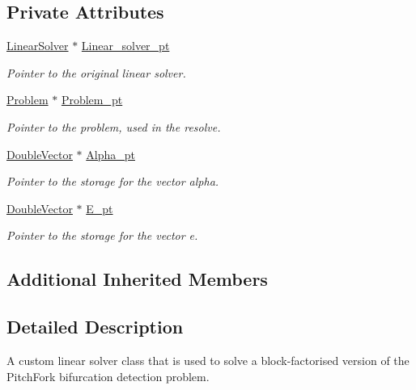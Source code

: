 \subsection*{Private Attributes}
\begin{DoxyCompactItemize}
\item 
\hyperlink{classoomph_1_1LinearSolver}{Linear\+Solver} $\ast$ \hyperlink{classoomph_1_1AugmentedBlockPitchForkLinearSolver_a1a3e1949c94c04c3b4ec19f0b895f97c}{Linear\+\_\+solver\+\_\+pt}
\begin{DoxyCompactList}\small\item\em Pointer to the original linear solver. \end{DoxyCompactList}\item 
\hyperlink{classoomph_1_1Problem}{Problem} $\ast$ \hyperlink{classoomph_1_1AugmentedBlockPitchForkLinearSolver_ad9e72a0a848aebe2b107a56b45aa4552}{Problem\+\_\+pt}
\begin{DoxyCompactList}\small\item\em Pointer to the problem, used in the resolve. \end{DoxyCompactList}\item 
\hyperlink{classoomph_1_1DoubleVector}{Double\+Vector} $\ast$ \hyperlink{classoomph_1_1AugmentedBlockPitchForkLinearSolver_a37d6d7eb053d062cabc6688f7c8fe240}{Alpha\+\_\+pt}
\begin{DoxyCompactList}\small\item\em Pointer to the storage for the vector alpha. \end{DoxyCompactList}\item 
\hyperlink{classoomph_1_1DoubleVector}{Double\+Vector} $\ast$ \hyperlink{classoomph_1_1AugmentedBlockPitchForkLinearSolver_a478bca515ee961576f523b1b5152651f}{E\+\_\+pt}
\begin{DoxyCompactList}\small\item\em Pointer to the storage for the vector e. \end{DoxyCompactList}\end{DoxyCompactItemize}
\subsection*{Additional Inherited Members}


\subsection{Detailed Description}
A custom linear solver class that is used to solve a block-\/factorised version of the Pitch\+Fork bifurcation detection problem. 

